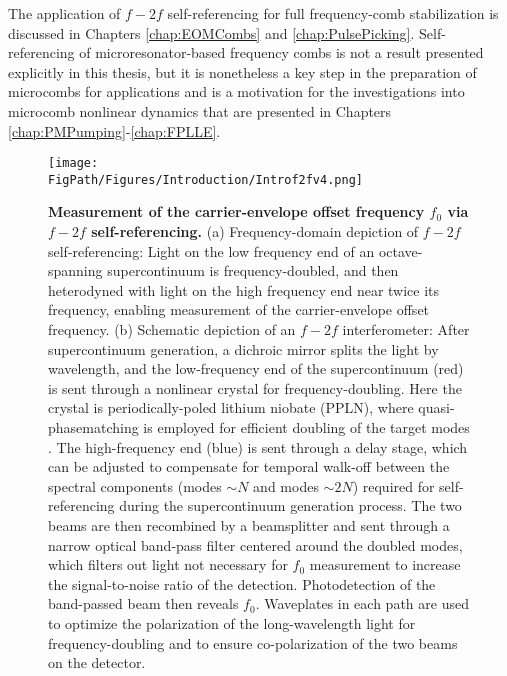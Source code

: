 The application of $f-2f$ self-referencing for full frequency-comb stabilization is discussed in Chapters \ref{chap:EOMCombs} and \ref{chap:PulsePicking}. Self-referencing of microresonator-based frequency combs is not a result presented explicitly in this thesis, but it is nonetheless a key step in the preparation of microcombs for applications and is a  motivation for the investigations into microcomb nonlinear dynamics that are presented in Chapters \ref{chap:PMPumping}-\ref{chap:FPLLE}.


\begin{figure}[htpb]
	\begin{center}
		\texttt{[image: \\FigPath/Figures/Introduction/Introf2fv4.png]}
	\end{center}
	\caption[Measurement of the carrier-envelope offset frequency via $f-2f$ self-referencing]{\textbf{Measurement of the carrier-envelope offset frequency $f_0$ via $f-2f$ self-referencing.} (a) Frequency-domain depiction of $f-2f$ self-referencing: Light on the low frequency end of an octave-spanning supercontinuum is frequency-doubled, and then heterodyned with light on the high frequency end near twice its frequency, enabling measurement of the carrier-envelope offset frequency. (b) Schematic depiction of an $f-2f$ interferometer: After supercontinuum generation, a dichroic mirror splits the light by wavelength, and the low-frequency end of the supercontinuum (red) is sent through a nonlinear crystal for frequency-doubling. Here the crystal is periodically-poled lithium niobate (PPLN), where quasi-phasematching is employed for efficient doubling of the target modes \cite{Hum2007}. The high-frequency end (blue) is sent through a delay stage, which can be adjusted to compensate for temporal walk-off between the spectral components (modes $\sim N$ and modes $\sim 2N$) required for self-referencing during the supercontinuum generation process. The two beams are then recombined by a beamsplitter and sent through a narrow optical band-pass filter centered around the doubled modes, which filters out light not necessary for $f_0$ measurement to increase the signal-to-noise ratio of the detection. Photodetection of the band-passed beam then reveals $f_0$. Waveplates in each path are used to optimize the polarization of the long-wavelength light for frequency-doubling and to ensure co-polarization of the two beams on the detector. }
	\label{fig:f2f}
\end{figure} 
